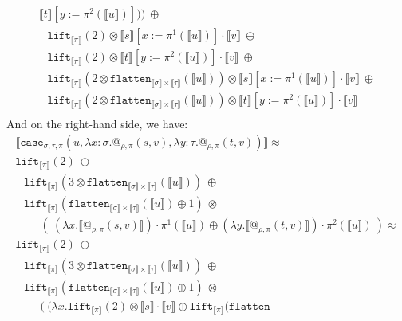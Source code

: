 \documentclass[a4paper,UKenglish,cleveref,autoref,numberwithinsect]{lipics-v2019}
\theoremstyle{definition}
\newcommand{\abs}[2]{\lambda #1.#2}
\newcommand{\flatten}{\mathtt{flatten}}
\newcommand{\lift}{\mathtt{lift}}
\newcommand{\typeinterpret}[1]{\llbracket #1 \rrbracket}
\newcommand{\interpret}[1]{\llbracket #1 \rrbracket}
\begin{document}
\begin{itemize}
\[\begin{array}{l}
    \interpret{t}[y:=\pi^2(\interpret{u})]))\ \oplus \\
  \phantom{A}
  \lift_{\typeinterpret{\pi}}(2) \otimes
    \interpret{s}[x:=\pi^1(\interpret{u})] \cdot \interpret{v}\ \oplus \\
  \phantom{A}
  \lift_{\typeinterpret{\pi}}(2) \otimes
     \interpret{t}[y:=\pi^2(\interpret{u})] \cdot \interpret{v}\
     \oplus \\
  \phantom{A}
  \lift_{\typeinterpret{\pi}}(2 \otimes
    \flatten_{\typeinterpret{\sigma} \times \typeinterpret{\tau}}(
    \interpret{u})) \otimes
    \interpret{s}[x:=\pi^1(\interpret{u})] \cdot \interpret{v}\ \oplus \\
  \phantom{A}
  \lift_{\typeinterpret{\pi}}(2 \otimes
    \flatten_{\typeinterpret{\sigma} \times \typeinterpret{\tau}}(
    \interpret{u})) \otimes
     \interpret{t}[y:=\pi^2(\interpret{u})] \cdot \interpret{v} \\
  \end{array}
  \]
  And on the right-hand side, we have:
  \[
  \begin{array}{l}
  \interpret{\mathtt{case}_{\sigma,\tau,\pi}(u,\abs{x:\sigma}{
  @_{\rho,\pi}(s,v)},\abs{y:\tau}{@_{\rho,\pi}(t,v)})} \approx \\
  \lift_{\typeinterpret{\pi}}(2)\ \oplus \\
  \phantom{A}
  \lift_{\typeinterpret{\pi}}(3 \otimes \flatten_{\typeinterpret{\sigma}
    \times \typeinterpret{\tau}}(\interpret{u}))\ \oplus \\
  \phantom{A}
  \lift_{\typeinterpret{\pi}}(\flatten_{\typeinterpret{\sigma} \times
    \typeinterpret{\tau}}(\interpret{u}) \oplus 1)\ \otimes \\
  \phantom{ABC}
  (\ (\abs{x}{\interpret{@_{\rho,\pi}(s,v)}}) \cdot \pi^1(
      \interpret{u}) \oplus
     (\abs{y}{\interpret{@_{\rho,\pi}(t,v)}}) \cdot \pi^2(
      \interpret{u})\ ) \approx \\
  \lift_{\typeinterpret{\pi}}(2)\ \oplus \\
  \phantom{A}
  \lift_{\typeinterpret{\pi}}(3 \otimes \flatten_{\typeinterpret{\sigma}
    \times \typeinterpret{\tau}}(\interpret{u}))\ \oplus \\
  \phantom{A}
  \lift_{\typeinterpret{\pi}}(\flatten_{\typeinterpret{\sigma} \times
    \typeinterpret{\tau}}(\interpret{u}) \oplus 1)\ \otimes \\
  \phantom{ABC}
  (\ (\abs{x}{\lift_{\typeinterpret{\pi}}(2) \otimes
    \interpret{s} \cdot \interpret{v} \oplus
    \lift_{\typeinterpret{\pi}}(\flatten_{
}}
\end{array}\]
\end{itemize}
\end{document}
